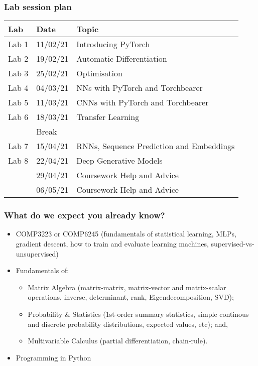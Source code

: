 \documentclass[\beamerclass]{beamer}
\begin{document}
\begin{frame}
	\frametitle{Lab session plan}
	
	\begin{center}
	\begin{tabular}{ l l l }
		 Lab & Date & Topic \\ \hline
		 Lab 1  & 11/02/21 & Introducing PyTorch \\ 
		 Lab 2  & 19/02/21 & Automatic Differentiation \\  
		 Lab 3  & 25/02/21 & Optimisation \\
		 Lab 4  & 04/03/21 & NNs with PyTorch and Torchbearer \\
 		 Lab 5  & 11/03/21 & CNNs with PyTorch and Torchbearer \\
 		 Lab 6  & 18/03/21 & Transfer Learning \\
 		 \hline
 		 & Break & \\
		 \hline
		 Lab 7  & 15/04/21 & RNNs, Sequence Prediction and Embeddings \\
		 Lab 8  & 22/04/21 & Deep Generative Models \\
		        & 29/04/21 & Coursework Help and Advice \\
 		 	    & 06/05/21 & Coursework Help and Advice \\
	\end{tabular}
	\end{center}
\end{frame}

\begin{frame}
	\frametitle{What do we expect you already know?}
	
	\begin{itemize}
	\item<+-> COMP3223 or COMP6245 (fundamentals of statistical learning, MLPs, gradient descent, how to train and evaluate learning machines, supervised-vs-unsupervised)
	\item<+-> Fundamentals of:
	\begin{itemize}
		\item Matrix Algebra (matrix-matrix, matrix-vector and matrix-scalar operations, inverse, determinant, rank, Eigendecomposition, SVD);
		\item Probability \& Statistics (1st-order summary statistics, simple continous and discrete probability distributions, expected values, etc); and, 
		\item Multivariable Calculus (partial differentiation, chain-rule).
	\end{itemize}
	\item<+-> Programming in Python
	\end{itemize}
\end{frame}
\end{document}
